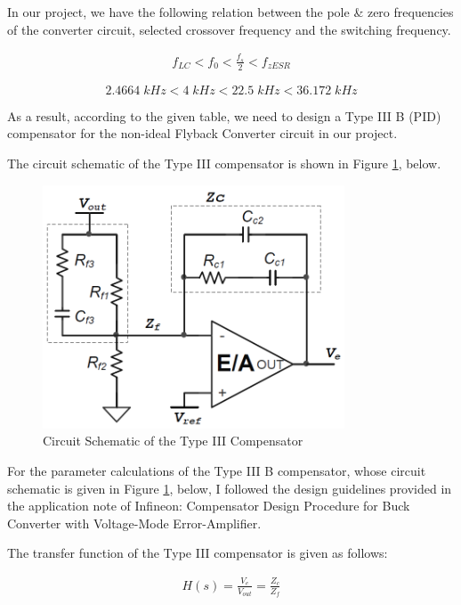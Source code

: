 In our project, we have the following relation between the  pole \& zero frequencies of the converter circuit, selected crossover frequency and the switching frequency.

\begin{align}
    f_{LC} < f_{0} < \frac{f_s}{2} < f_{zESR}
\end{align}

$$ 2.4664\; kHz < 4\; kHz < 22.5\; kHz < 36.172\; kHz $$

As a result, according to the given table, we need to design a Type III B (PID) compensator for the non-ideal Flyback Converter circuit in our project.

The circuit schematic of the Type III compensator is shown in Figure \ref{com:type3b}, below.

\begin{figure}[H]
\begin{center}
\includegraphics[width=0.8\textwidth]{Compensator/type3b.png}
\caption{Circuit Schematic of the Type III Compensator}
\label{com:type3b}
\end{center}
\end{figure}

For the parameter calculations of the Type III B compensator, whose circuit schematic is given in Figure \ref{com:type3b}, below, I followed the design guidelines provided in the application note of Infineon: Compensator Design Procedure for Buck Converter with Voltage-Mode Error-Amplifier.

The transfer function of the Type III compensator is given as follows:

\begin{align}
    H(s) = \frac{V_e}{V_{out}} = \frac{Z_c}{Z_f}
\end{align}

